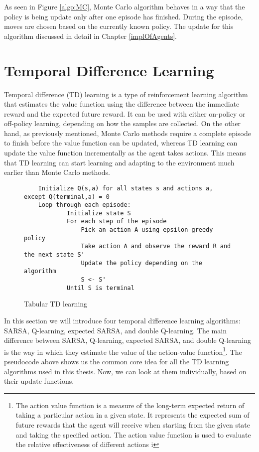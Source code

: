 As seen in Figure \ref{algo:MC}, Monte Carlo algorithm behaves in a way that the policy is being update only after one episode has finished. During the episode, moves are chosen based on the currently known policy. The update for this algorithm discussed in detail in Chapter \ref{implOfAgents}.

\section{Temporal Difference Learning}
Temporal difference (TD) learning is a type of reinforcement learning algorithm that estimates the value function using the difference between the immediate reward and the expected future reward. It can be used with either on-policy or off-policy learning, depending on how the samples are collected.
On the other hand, as previously mentioned, Monte Carlo methods require a complete episode to finish before the value function can be updated, whereas TD learning can update the value function incrementally as the agent takes actions. This means that TD learning can start learning and adapting to the environment much earlier than Monte Carlo methods.

\begin{figure}[h]
    \centering
    \begin{lstlisting}
    Initialize Q(s,a) for all states s and actions a, except Q(terminal,a) = 0
    Loop through each episode:
    		Initialize state S
    		For each step of the episode
    			Pick an action A using epsilon-greedy policy
    			Take action A and observe the reward R and the next state S' 
    			Update the policy depending on the algorithm
    			S <- S'
    		Until S is terminal
	\end{lstlisting}
    \caption{Tabular TD learning}
    \label{algo:TD}
\end{figure}

In this section we will introduce four temporal difference learning algorithms: SARSA, Q-learning, expected SARSA, and double Q-learning.  The main difference between SARSA, Q-learning, expected SARSA, and double Q-learning is the way in which they estimate the value of the action-value function\footnote{The action value function is a measure of the long-term expected return of taking a particular action in a given state. It represents the expected sum of future rewards that the agent will receive when starting from the given state and taking the specified action. The action value function is used to evaluate the relative effectiveness of different actions i}. The pseudocode above shows us the common core idea for all the TD learning algorithms used in this thesis. Now, we can look at them individually, based on their update functions.

